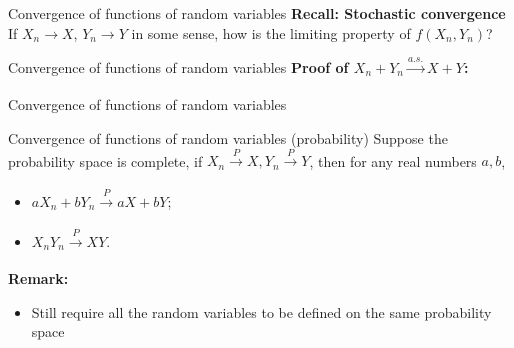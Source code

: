 \documentclass [aspectratio=169]{beamer}
\begin{document}
\begin{frame}{Convergence of functions of random variables}
    \textbf{Recall: Stochastic convergence}
    If $X_n \to X$, $Y_n \to Y$ in some sense, how is the limiting property of $f(X_n, Y_n)$?
    \vspace{0.1in}
\vspace{0.2in}
\end{frame}

\begin{frame}{Convergence of functions of random variables}
\textbf{Proof of $X_n + Y_n \xrightarrow[]{a.s.} X + Y$:}

\vspace{6cm}

\end{frame}


\begin{frame}{Convergence of functions of random variables}
    \begin{block}{Convergence of functions of random variables (probability)}
     Suppose the probability space is complete, if $X_n  \xrightarrow[]{P} X, Y_n  \xrightarrow[]{P} Y$, then for any real numbers $a, b$, \begin{itemize}
        \item $aX_n + bY_n  \xrightarrow[]{P} aX + bY$;
        \item $X_n Y_n  \xrightarrow[]{P} XY$.
    \end{itemize}
    \end{block}
    \vspace{0.1in}
    \textbf{Remark:}
    \begin{itemize}
        \item Still require all the random variables to be defined on the same probability space
        
    \end{itemize}
\end{frame}
\end{document}
